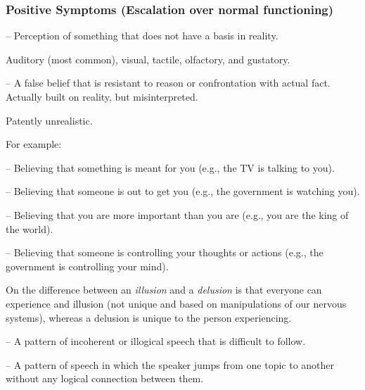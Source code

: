 \subsubsection{Positive Symptoms (Escalation over normal functioning)}

\begin{coloredlist}
    \item {} -- Perception of something that does not have a basis in reality.
    \begin{coloredlist}
        \item Auditory (most common), visual, tactile, olfactory, and gustatory.
        \item 
    \end{coloredlist}
    \item {} -- A false belief that is resistant to reason or confrontation with actual fact. Actually built on reality, but misinterpreted.
    \begin{coloredlist}
        \item Patently unrealistic.
        \item For example:
        \begin{coloredlist}
            \item {} -- Believing that something is meant for you (e.g., the TV is talking to you).
            \item {} -- Believing that someone is out to get you (e.g., the government is watching you).
            \item {} -- Believing that you are more important than you are (e.g., you are the king of the world).
            \item {} -- Believing that someone is controlling your thoughts or actions (e.g., the government is controlling your mind).
        \end{coloredlist}
        \item On the difference between an \textit{illusion} and a \textit{delusion} is that everyone can experience and illusion (not unique and based on manipulations of our nervous systems), whereas a delusion is unique to the person experiencing.
    \end{coloredlist}
    \item {} -- A pattern of incoherent or illogical speech that is difficult to follow.
    \begin{coloredlist}
        \item {} -- A pattern of speech in which the speaker jumps from one topic to another without any logical connection between them.

\end{coloredlist}
\end{coloredlist}
